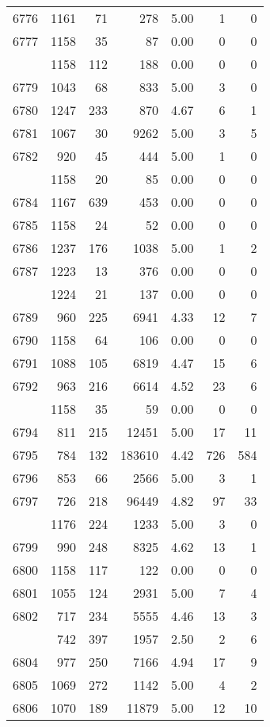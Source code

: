 \documentclass[
]{article}
\begin{document}
\begin{table}
\begin{tabular}[t]{lrrrrrr}
6776 & 1161 & 71 & 278 & 5.00 & 1 & 0\\
6777 & 1158 & 35 & 87 & 0.00 & 0 & 0\\
\addlinespace
6778 & 1158 & 112 & 188 & 0.00 & 0 & 0\\
6779 & 1043 & 68 & 833 & 5.00 & 3 & 0\\
6780 & 1247 & 233 & 870 & 4.67 & 6 & 1\\
6781 & 1067 & 30 & 9262 & 5.00 & 3 & 5\\
6782 & 920 & 45 & 444 & 5.00 & 1 & 0\\
\addlinespace
6783 & 1158 & 20 & 85 & 0.00 & 0 & 0\\
6784 & 1167 & 639 & 453 & 0.00 & 0 & 0\\
6785 & 1158 & 24 & 52 & 0.00 & 0 & 0\\
6786 & 1237 & 176 & 1038 & 5.00 & 1 & 2\\
6787 & 1223 & 13 & 376 & 0.00 & 0 & 0\\
\addlinespace
6788 & 1224 & 21 & 137 & 0.00 & 0 & 0\\
6789 & 960 & 225 & 6941 & 4.33 & 12 & 7\\
6790 & 1158 & 64 & 106 & 0.00 & 0 & 0\\
6791 & 1088 & 105 & 6819 & 4.47 & 15 & 6\\
6792 & 963 & 216 & 6614 & 4.52 & 23 & 6\\
\addlinespace
6793 & 1158 & 35 & 59 & 0.00 & 0 & 0\\
6794 & 811 & 215 & 12451 & 5.00 & 17 & 11\\
6795 & 784 & 132 & 183610 & 4.42 & 726 & 584\\
6796 & 853 & 66 & 2566 & 5.00 & 3 & 1\\
6797 & 726 & 218 & 96449 & 4.82 & 97 & 33\\
\addlinespace
6798 & 1176 & 224 & 1233 & 5.00 & 3 & 0\\
6799 & 990 & 248 & 8325 & 4.62 & 13 & 1\\
6800 & 1158 & 117 & 122 & 0.00 & 0 & 0\\
6801 & 1055 & 124 & 2931 & 5.00 & 7 & 4\\
6802 & 717 & 234 & 5555 & 4.46 & 13 & 3\\
\addlinespace
6803 & 742 & 397 & 1957 & 2.50 & 2 & 6\\
6804 & 977 & 250 & 7166 & 4.94 & 17 & 9\\
6805 & 1069 & 272 & 1142 & 5.00 & 4 & 2\\
6806 & 1070 & 189 & 11879 & 5.00 & 12 & 10\\

\end{tabular}
\end{table}
\end{document}
